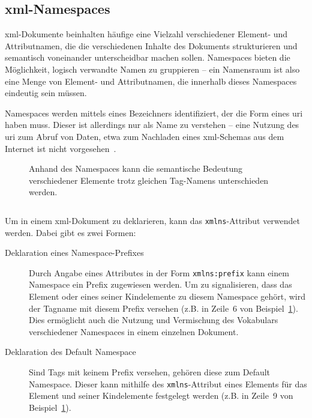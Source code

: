 \subsection{\acrshort{xml}-Namespaces}
\label{sec:xmlns}

\acrshort{xml}-Dokumente beinhalten häufige eine Vielzahl verschiedener Element- und Attributnamen, die die verschiedenen Inhalte des Dokuments strukturieren und semantisch voneinander unterscheidbar machen sollen. Namespaces bieten die Möglichkeit, logisch verwandte Namen zu gruppieren -- ein Namensraum ist also eine Menge von Element- und Attributnamen, die innerhalb dieses Namespaces eindeutig sein müssen.

Namespaces werden mittels eines Bezeichners identifiziert, der die Form eines \gls{uri} haben muss. Dieser ist allerdings nur als Name zu verstehen -- eine Nutzung des \gls{uri} zum Abruf von Daten, etwa zum Nachladen eines \acrshort{xml}-Schemas aus dem Internet ist nicht vorgesehen~\cite[Abschn.~3]{xmlns}.

\begin{figure}[h]
    \begin{example}
        \label{ex:xmlns}
        Anhand des Namespaces kann die semantische Bedeutung verschiedener Elemente trotz gleichen Tag-Namens unterschieden werden.
        \inputminted[firstline=2,firstnumber=1]{xml}{ex-xmlns.xml}
    \end{example}
\end{figure}

Um in einem \acrshort{xml}-Dokument zu deklarieren, kann das \texttt{xmlns}-Attribut verwendet werden. Dabei gibt es zwei Formen:

\begin{description}
    \item[Deklaration eines Namespace-Prefixes] Durch Angabe eines Attributes in der Form \texttt{xmlns:prefix} kann einem Namespace ein Prefix zugewiesen werden. Um zu signalisieren, dass das Element oder eines seiner Kindelemente zu diesem Namespace gehört, wird der Tagname mit diesem Prefix versehen (z.B. in Zeile~6 von Beispiel~\ref{ex:xmlns}). Dies ermöglicht auch die Nutzung und Vermischung des Vokabulars verschiedener Namespaces in einem einzelnen Dokument.
    \item[Deklaration des Default Namespace] Sind Tags mit keinem Prefix versehen, gehören diese zum Default Namespace. Dieser kann mithilfe des \texttt{xmlns}-Attribut eines Elements für das Element und seiner Kindelemente festgelegt werden (z.B. in Zeile~9 von Beispiel~\ref{ex:xmlns}).
\end{description}

